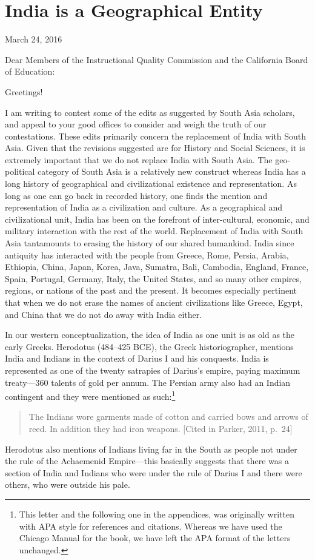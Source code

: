 \chapter{India is a Geographical Entity}

March 24, 2016
\vskip 2pt

Dear Members of the Instructional Quality Commission and the California Board of Education:
\vskip 2pt

Greetings!
\vskip 2pt

I am writing to contest some of the edits as suggested by South Asia scholars, and appeal to your good offices to consider and weigh the truth of our contestations. These edits primarily concern the replacement of India with South Asia. Given that the revisions suggested are for History and Social Sciences, it is extremely important that we do not replace India with South Asia. The geo-political category of South Asia is a relatively new construct whereas India has a long history of geographical and civilizational existence and representation. As long as one can go back in recorded history, one finds the mention and representation of India as a civilization and culture. As a geographical and civilizational unit, India has been on the forefront of inter-cultural, economic, and military interaction with the rest of the world. Replacement of India with South Asia tantamounts to erasing the history of our shared humankind. India since antiquity has interacted with the people from Greece, Rome, Persia, Arabia, Ethiopia, China, Japan, Korea, Java, Sumatra, Bali, Cambodia, England, France, Spain, Portugal, Germany, Italy, the United States, and so many other empires, regions, or nations of the past and the present. It becomes especially pertinent that when we do not erase the names of ancient civilizations like Greece, Egypt, and China that we do not do away with India either.

In our western conceptualization, the idea of India as one unit is as old as the early Greeks. Herodotus (484--425 BCE), the Greek historiographer, mentions India and Indians in the context of Darius I and his conquests. India is represented as one of the twenty satrapies of Darius’s empire, paying maximum treaty—360 talents of gold per annum. The Persian army also had an Indian contingent and they were mentioned as such:\footnote{This letter and the following one in the appendices, was originally written with APA style for references and citations. Whereas we have used the Chicago Manual for the book, we have left the APA format of the letters unchanged.}
\begin{quote}
The Indians wore garments made of cotton and carried bows and arrows of reed. In addition they had iron weapons. [Cited in Parker, 2011, p.\ 24]
\end{quote}
Herodotus also mentions of Indians living far in the South as people not under the rule of the Achaemenid Empire—this basically suggests that there was a section of India and Indians who were under the rule of Darius I and there were others, who were outside his pale.

